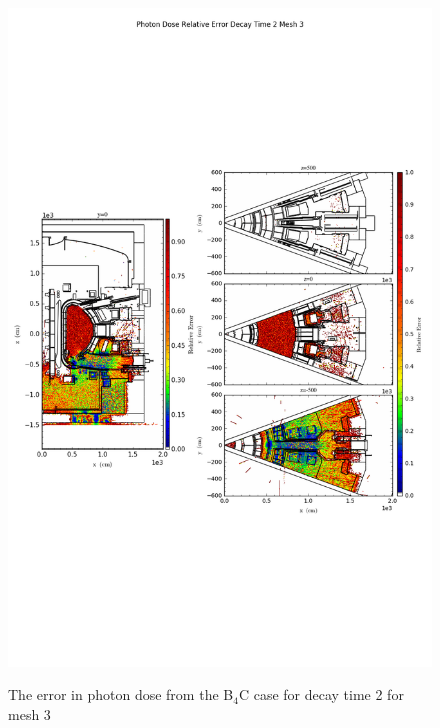 \begin{figure}[ht!]
\centering
\includegraphics[trim={0cm 9cm 0cm 10cm},clip,scale=0.75]{../plots/final_model_with_b4c/Photon_Dose_Relative_Error_Decay_Time_2_Mesh_3.png}
\label{fig:photons_dc2_no4bc_m3_error}
\caption{The error in photon dose from the B$_4$C case for decay time 2 for mesh 3}
\end{figure}
